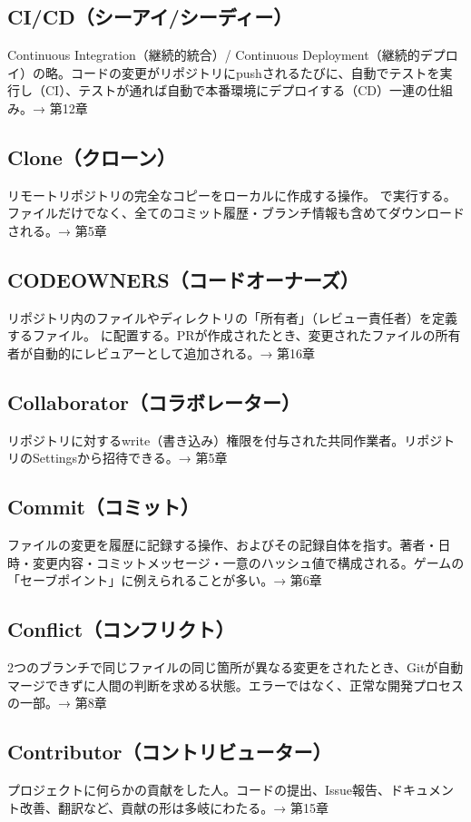 \subsection*{CI/CD（シーアイ/シーディー）}
Continuous Integration（継続的統合）/ Continuous Deployment（継続的デプロイ）の略。コードの変更がリポジトリにpushされるたびに、自動でテストを実行し（CI）、テストが通れば自動で本番環境にデプロイする（CD）一連の仕組み。→ 第12章

\subsection*{Clone（クローン）}
リモートリポジトリの完全なコピーをローカルに作成する操作。 で実行する。ファイルだけでなく、全てのコミット履歴・ブランチ情報も含めてダウンロードされる。→ 第5章

\subsection*{CODEOWNERS（コードオーナーズ）}
リポジトリ内のファイルやディレクトリの「所有者」（レビュー責任者）を定義するファイル。 に配置する。PRが作成されたとき、変更されたファイルの所有者が自動的にレビュアーとして追加される。→ 第16章

\subsection*{Collaborator（コラボレーター）}
リポジトリに対するwrite（書き込み）権限を付与された共同作業者。リポジトリのSettingsから招待できる。→ 第5章

\subsection*{Commit（コミット）}
ファイルの変更を履歴に記録する操作、およびその記録自体を指す。著者・日時・変更内容・コミットメッセージ・一意のハッシュ値で構成される。ゲームの「セーブポイント」に例えられることが多い。→ 第6章

\subsection*{Conflict（コンフリクト）}
2つのブランチで同じファイルの同じ箇所が異なる変更をされたとき、Gitが自動マージできずに人間の判断を求める状態。エラーではなく、正常な開発プロセスの一部。→ 第8章

\subsection*{Contributor（コントリビューター）}
プロジェクトに何らかの貢献をした人。コードの提出、Issue報告、ドキュメント改善、翻訳など、貢献の形は多岐にわたる。→ 第15章

